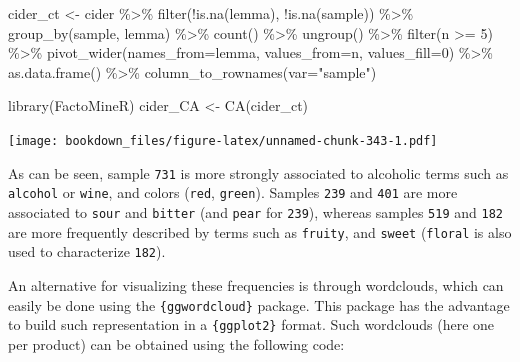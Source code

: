 \documentclass[
]{krantz}
\makeatletter
\newenvironment{Shaded}{\begin{snugshade}}{\end{snugshade}}
\newcommand{\AttributeTok}[1]{\textcolor[rgb]{0.61,0.61,0.61}{#1}}
\newcommand{\DecValTok}[1]{\textcolor[rgb]{0.06,0.06,0.06}{#1}}
\newcommand{\FunctionTok}[1]{\textcolor[rgb]{0,0,0}{#1}}
\newcommand{\NormalTok}[1]{#1}
\newcommand{\OtherTok}[1]{\textcolor[rgb]{0.37,0.37,0.37}{#1}}
\newcommand{\SpecialCharTok}[1]{\textcolor[rgb]{0,0,0}{#1}}
\newcommand{\StringTok}[1]{\textcolor[rgb]{0.5,0.5,0.5}{#1}}
\newenvironment{kframe}{%
\medskip{}
\setlength{\fboxsep}{.8em}
 \def\at@end@of@kframe{}%
 \ifinner\ifhmode%
  \def\at@end@of@kframe{\end{minipage}}%
  \begin{minipage}{\columnwidth}%
 \fi\fi%
 \def\FrameCommand##1{\hskip\@totalleftmargin \hskip-\fboxsep
 \colorbox{shadecolor}{##1}\hskip-\fboxsep
     \hskip-\linewidth \hskip-\@totalleftmargin \hskip\columnwidth}%
 \MakeFramed {\advance\hsize-\width
   \@totalleftmargin\z@ \linewidth\hsize
   \@setminipage}}%
 {\par\unskip\endMakeFramed%
 \at@end@of@kframe}
\renewenvironment{Shaded}{\begin{kframe}}{\end{kframe}}
\makeatother
\begin{document}
\begin{Shaded}
\begin{Highlighting}[]
\NormalTok{cider\_ct }\OtherTok{\textless{}{-}}\NormalTok{ cider }\SpecialCharTok{\%\textgreater{}\%} 
  \FunctionTok{filter}\NormalTok{(}\SpecialCharTok{!}\FunctionTok{is.na}\NormalTok{(lemma), }\SpecialCharTok{!}\FunctionTok{is.na}\NormalTok{(sample)) }\SpecialCharTok{\%\textgreater{}\%} 
  \FunctionTok{group\_by}\NormalTok{(sample, lemma) }\SpecialCharTok{\%\textgreater{}\%} 
  \FunctionTok{count}\NormalTok{() }\SpecialCharTok{\%\textgreater{}\%} 
  \FunctionTok{ungroup}\NormalTok{() }\SpecialCharTok{\%\textgreater{}\%} 
  \FunctionTok{filter}\NormalTok{(n }\SpecialCharTok{\textgreater{}=} \DecValTok{5}\NormalTok{) }\SpecialCharTok{\%\textgreater{}\%} 
  \FunctionTok{pivot\_wider}\NormalTok{(}\AttributeTok{names\_from=}\NormalTok{lemma, }\AttributeTok{values\_from=}\NormalTok{n, }\AttributeTok{values\_fill=}\DecValTok{0}\NormalTok{) }\SpecialCharTok{\%\textgreater{}\%} 
  \FunctionTok{as.data.frame}\NormalTok{() }\SpecialCharTok{\%\textgreater{}\%} 
  \FunctionTok{column\_to\_rownames}\NormalTok{(}\AttributeTok{var=}\StringTok{"sample"}\NormalTok{)}

\FunctionTok{library}\NormalTok{(FactoMineR)}
\NormalTok{cider\_CA }\OtherTok{\textless{}{-}} \FunctionTok{CA}\NormalTok{(cider\_ct)}
\end{Highlighting}
\end{Shaded}

\texttt{[image: bookdown\_files/figure-latex/unnamed-chunk-343-1.pdf]}

As can be seen, sample \texttt{731} is more strongly associated to alcoholic terms such as \texttt{alcohol} or \texttt{wine}, and colors (\texttt{red}, \texttt{green}). Samples \texttt{239} and \texttt{401} are more associated to \texttt{sour} and \texttt{bitter} (and \texttt{pear} for \texttt{239}), whereas samples \texttt{519} and \texttt{182} are more frequently described by terms such as \texttt{fruity}, and \texttt{sweet} (\texttt{floral} is also used to characterize \texttt{182}).

An alternative for visualizing these frequencies is through wordclouds, which can easily be done using the \texttt{\{ggwordcloud\}} package. This package has the advantage to build such representation in a \texttt{\{ggplot2\}} format. Such wordclouds (here one per product) can be obtained using the following code:
\end{document}
